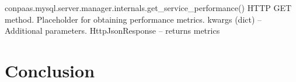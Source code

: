 \documentclass[a4paper,10pt]{article}
\begin{document}
\noindent\conapi
{ conpaas.mysql.server.manager.internals.get\_service\_performance()}
{ HTTP GET method. Placeholder for obtaining performance metrics.}
{ kwargs (dict) -- Additional parameters.}
{HttpJsonResponse -- returns metrics}
{}

\section{Conclusion}

\newpage
\vspace{4mm}

\begin{thebibliography}{99}
\end{thebibliography}
\end{document}
